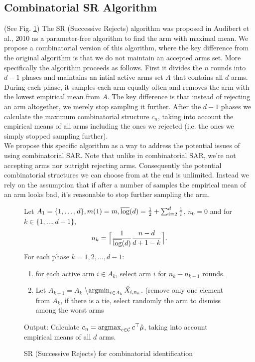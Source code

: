 \documentclass[11.75pt,oneside]{amsart}
\DeclarePairedDelimiter{\ceil}{\lceil}{\rceil}
\begin{document}
\subsection{Combinatorial SR Algorithm} (See Fig. \ref{combinsr})
The SR (Successive Rejects) algorithm was proposed in Audibert et al., 2010 \cite{ABM10} as a parameter-free algorithm to find the arm with maximal mean. We propose a combinatorial version of this algorithm, where the key difference from the original algorithm is that we do not maintain an accepted arms set. More specifically the algorithm proceeds as follows. First it divides the $n$ rounds into $d-1$ phases and maintains an intial active arms set $A$ that contains all $d$ arms. During each phase, it samples each arm equally often and removes the arm with the lowest empirical mean from $A$. The key difference is that instead of rejecting an arm altogether, we merely stop sampling it further. 
After the $d-1$ phases we calculate the maximum combinatorial structure $c_n$, taking into account the empirical means of all arms including the ones we rejected (i.e. the ones we simply stopped sampling further). \\

We propose this specific algorithm as a way to address the potential issues of using combinatorial SAR. Note that unlike in combinatorial SAR, we're not accepting arms nor outright rejecting arms. Consequently the potential combinatorial structures we can choose from at the end is unlimited. Instead we rely on the assumption that if after a number of samples the empirical mean of an arm looks bad, it's reasonable to stop further sampling the arm.\\

\begin{figure}[ht]
\raggedright
Let $A_1 = \{1, \hdots, d\}, m(1) = m,  \overline{\log}(d) = \frac{1}{2} + \sum_{i=2}^d\frac{1}{i}$, $n_0 = 0$ and for $k \in \{1, \hdots, d-1\}$,
$$ n_k = \ceil[\Big]{\frac{1}{\LG} \frac{n-d}{d+1-k}}.$$
\vspace{10pt}
For each phase $k=1,2, \hdots, d-1$:\\
\vspace{5pt}
\begin{enumerate}
\item{for each active arm $i \in A_k$, select arm $i$ for $n_{k} - n_{k-1}$ rounds.}
\vspace{5pt}
\item{Let $A_{k+1} = A_k$ \textbackslash $\mathop{\mathrm{argmin}}_{i \in A_k} \hat{X}_{i,n_k}$. (remove only one element from $A_k$, if there is a tie, select randomly the arm to dismiss among the worst arms}
\end{enumerate}
\vspace{5pt}
Output: Calculate $c_n = \mathop{\mathrm{argmax}}_{c \in \mathcal{C}} c^{\top} \hat{\mu}$, taking into account empirical means of all $d$ arms.
\caption{\label{combinsr} SR (Successive Rejects) for combinatorial identification}
\end{figure}
\end{document}
